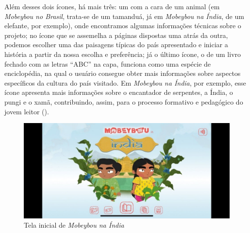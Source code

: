 \documentclass[portuguese]{textolivre}
\begin{document}
Além desses dois ícones, há mais três: um com a cara de um animal (em
\textit{Mobeybou no Brasil}, trata-se de um tamanduá, já em \textit{Mobeybou na
Índia}, de um elefante, por exemplo), onde encontramos algumas informações
técnicas sobre o projeto; no ícone que se assemelha a páginas dispostas uma
atrás da outra, podemos escolher uma das paisagens típicas do país apresentado
e iniciar a história a partir da nossa escolha e preferência; já o último
ícone, o de um livro fechado com as letras “ABC” na capa, funciona como uma
espécie de enciclopédia, na qual o usuário consegue obter mais informações
sobre aspectos específicos da cultura do país visitado. Em \textit{Mobeybou na
Índia}, por exemplo, esse ícone apresenta mais informações sobre o encantador
de serpentes, a Índia, o pungi e o xamã, contribuindo, assim, para o processo
formativo e pedagógico do jovem leitor ().

\begin{figure}
    \centering
    \includegraphics[width=0.85\linewidth]{Fig4.jpeg}
    \caption{Tela inicial de \textit{Mobeybou na Índia}}
    \label{fig4}
\end{figure}
\end{document}
